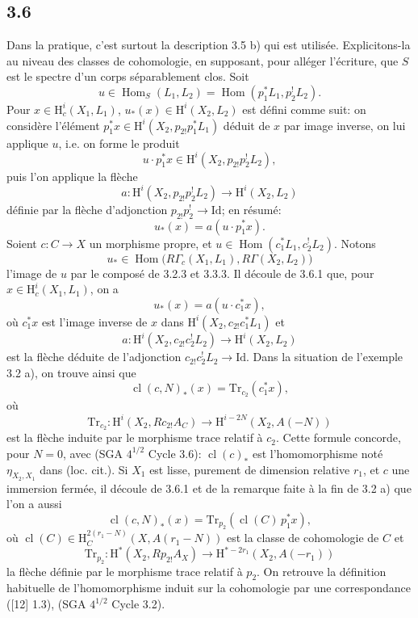 \documentclass[11pt]{article}
\renewcommand{\H}{\mathrm{H}}
\DeclareMathOperator{\Hom}{Hom}
\providecommand{\Id}{\mathrm{Id}}
\providecommand{\Hom}{\operatorname{Hom}}
\providecommand{\Hom}{\operatorname{Hom}}
\begin{document}
\subsection*{3.6}
Dans la pratique, c'est surtout la description 3.5 b) qui est utilisée. Explicitons-la au niveau des classes de cohomologie, en supposant, pour alléger l'écriture, que $S$ est le spectre d'un corps séparablement clos. Soit
\[
u\in\Hom_S(L_1,L_2)=\Hom(p_1^*L_1,p_2^!L_2).
\]
Pour $x\in\H_c^i(X_1,L_1)$, $u_*(x)\in\H^i(X_2,L_2)$ est défini comme suit: on considère l'élément $p_1^*x\in\H^i(X_2,p_{2!}p_1^*L_1)$ déduit de $x$ par image inverse, on lui applique $u$, i.e. on forme le produit
\[
u\cdot p_1^*x\in \H^i(X_2,p_{2!}p_2^!L_2),
\]
puis l'on applique la flèche
\[
a:\H^i(X_2,p_{2!}p_2^!L_2)\longrightarrow \H^i(X_2,L_2)
\]
définie par la flèche d'adjonction $p_{2!}p_2^!\to\Id$; en résumé:
\begin{equation}
u_*(x)=a(u\cdot p_1^*x).
\tag{3.6.1}
\end{equation}
Soient $c:C\to X$ un morphisme propre, et $u\in\Hom(c_1^*L_1,c_2^!L_2)$. Notons
\[
u_*\in\Hom\bigl(R\Gamma_c(X_1,L_1),R\Gamma(X_2,L_2)\bigr)
\]
l'image de $u$ par le composé de 3.2.3 et 3.3.3. Il découle de 3.6.1 que, pour $x\in\H_c^i(X_1,L_1)$, on a
\begin{equation}
u_*(x)=a(u\cdot c_1^*x),
\tag{3.6.2}
\end{equation}
où $c_1^*x$ est l'image inverse de $x$ dans $\H^i(X_2,c_{2!}c_1^*L_1)$ et
\[
a:\H^i(X_2,c_{2!}c_2^!L_2)\longrightarrow \H^i(X_2,L_2)
\]
est la flèche déduite de l'adjonction $c_{2!}c_2^!L_2\to\Id$. Dans la situation de l'exemple 3.2 a), on trouve ainsi que
\begin{equation}
\operatorname{cl}(c,N)_*(x)=\mathrm{Tr}_{c_2}(c_1^*x),
\tag{3.6.3}
\end{equation}
où
\[
\mathrm{Tr}_{c_2}:\H^i(X_2,Rc_{2!}A_C)\longrightarrow\H^{i-2N}(X_2,A(-N))
\]
est la flèche induite par le morphisme trace relatif à $c_2$. Cette formule concorde, pour $N=0$, avec (SGA $4^{1/2}$ Cycle 3.6): $\operatorname{cl}(c)_*$ est l'homomorphisme noté $\eta_{X_2,X_1}$ dans (loc. cit.). Si $X_1$ est lisse, purement de dimension relative $r_1$, et $c$ une immersion fermée, il découle de 3.6.1 et de la remarque faite à la fin de 3.2 a) que l'on a aussi
\begin{equation}
\operatorname{cl}(c,N)_*(x)=\mathrm{Tr}_{p_2}(\operatorname{cl}(C)\,p_1^*x),
\tag{3.6.4}
\end{equation}
où $\operatorname{cl}(C)\in \H_C^{2(r_1-N)}(X,A(r_1-N))$ est la classe de cohomologie de $C$ et
\[
\mathrm{Tr}_{p_2}:\H^*(X_2,Rp_{2!}A_X)\longrightarrow \H^{*-2r_1}(X_2,A(-r_1))
\]
la flèche définie par le morphisme trace relatif à $p_2$. On retrouve la définition habituelle de l'homomorphisme induit sur la cohomologie par une correspondance ([12] 1.3), (SGA $4^{1/2}$ Cycle 3.2).
\end{document}
